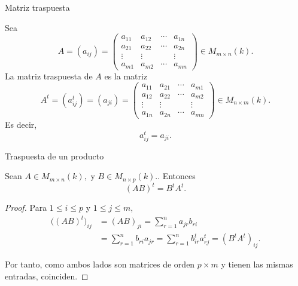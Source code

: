 \begin{frame}{Matriz traspuesta}

\begin{definition}
Sea
\[
A=(a_{ij})=\begin{pmatrix}
a_{11}&a_{12}&\cdots&a_{1n}\\
a_{21}&a_{22}&\cdots&a_{2n}\\
\vdots&\vdots&&\vdots\\
a_{m1}&a_{m2}&\cdots&a_{mn}
\end{pmatrix}\in M_{m\times n}(k).
\]
La \alert{matriz traspuesta} de \(A\) es la matriz
\[
A^t=(a_{ij}^t)=(a_{ji})=\begin{pmatrix}
a_{11}&a_{21}&\cdots&a_{m1}\\
a_{12}&a_{22}&\cdots&a_{m2}\\
\vdots&\vdots&&\vdots\\
a_{1n}&a_{2n}&\cdots&a_{mn}
\end{pmatrix}\in M_{n\times m}(k).
\]
Es decir,
\[a^t_{ij}=a_{ji}.\]
\end{definition}

\end{frame}

\begin{frame}{Traspuesta de un producto}

\begin{proposition}
Sean
\(
A\in M_{m\times n}(k),
\) y \(
B\in M_{n\times p}(k).
\). 
Entonces
\[
(AB)^t=B^tA^t.
\]
\end{proposition}

\begin{proof}
Para \(1\leq i\leq p\) y \(1\leq j\leq m\),
\[
\begin{aligned}
\bigl((AB)^t\bigr)_{ij}
&=(AB)_{ji}=\sum_{r=1}^n a_{jr}b_{ri}\\
&=\sum_{r=1}^n b_{ri}a_{jr}=\sum_{r=1}^n b^t_{ir}a^t_{rj}=(B^tA^t)_{ij}.
\end{aligned}
\]

Por tanto, como ambos lados son matrices de orden \(p\times m\) y tienen las mismas entradas, coinciden.
\end{proof}

\end{frame}


